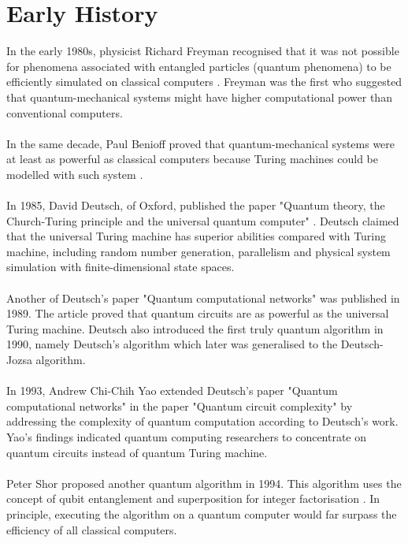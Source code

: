 \documentclass[12pt]{third-rep}
\begin{document}
\chapter{Early History}
In the early 1980s, physicist Richard Freyman recognised that it was not possible for phenomena associated with entangled particles (quantum phenomena) to be efficiently simulated on classical computers \cite{qc}. Freyman was the first who suggested that quantum-mechanical systems might have higher computational power than conventional computers. \\\\
In the same decade, Paul Benioff proved that quantum-mechanical systems were at least as powerful as classical computers because Turing machines could be modelled with such system \cite{qc-sci}. \\\\
In 1985, David Deutsch, of Oxford, published the paper "Quantum theory, the Church-Turing principle and the universal quantum computer" \cite{universal-qc}. Deutsch claimed that the universal Turing machine has superior abilities compared with Turing machine, including random number generation, parallelism and physical system simulation with finite-dimensional state spaces. \\\\
Another of Deutsch's paper "Quantum computational networks" \cite{qc-networks} was published in 1989. The article proved that quantum circuits are as powerful as the universal Turing machine. Deutsch also introduced the first truly quantum algorithm in 1990, namely Deutsch's algorithm which later was generalised to the Deutsch-Jozsa algorithm. \\\\
In 1993, Andrew Chi-Chih Yao extended Deutsch's paper "Quantum computational networks" \cite{circuit-complexity} in the paper "Quantum circuit complexity" by addressing the complexity of quantum computation according to Deutsch's work. Yao's findings indicated quantum computing researchers to concentrate on quantum circuits instead of quantum Turing machine. \\\\
Peter Shor proposed another quantum algorithm in 1994. This algorithm uses the concept of qubit entanglement and superposition for integer factorisation \cite{intro-qc}. In principle, executing the algorithm on a quantum computer would far surpass the efficiency of all classical computers. \\\\
\end{document}
